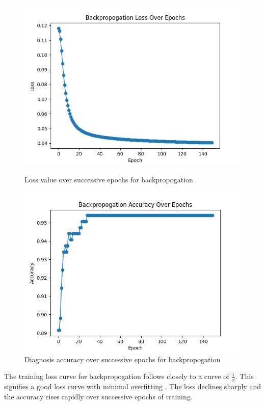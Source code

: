 \documentclass[12pt]{article}
\begin{document}
        \begin{figure}[h]
            \begin{minipage}{0.48\textwidth}
                \centering
                \includegraphics[width=.9\linewidth]{backproplosses.png}
                \caption{Loss value over successive epochs for backpropogation}
            \end{minipage}\hfill
            \begin{minipage}{0.48\textwidth}
                \centering
                \includegraphics[width=.9\linewidth]{backpropaccuracy.png}
                \caption{Diagnosis accuracy over successive epochs for backpropogation}
            \end{minipage}
        \end{figure}

        The training loss curve for backpropogation follows closely to a curve of \(\frac{1}{x}\).  This signifies a good loss curve with minimal
        overfitting \cite{goodLoss}.  The loss declines sharply and the accuracy rises rapidly over successive epochs of training.
        \pagebreak
\end{document}
